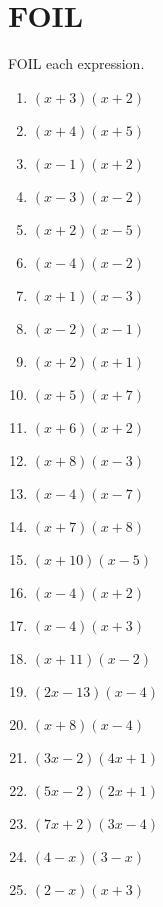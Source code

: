\section{FOIL}
FOIL each expression.
\begin{enumerate}
\item $(x+3)(x+2)$
\item $(x+4)(x+5)$
\item $(x-1)(x+2)$
\item $(x-3)(x-2)$
\item $(x+2)(x-5)$
\item $(x-4)(x-2)$
\item $(x+1)(x-3)$
\item $(x-2)(x-1)$
\item $(x+2)(x+1)$
\item $(x+5)(x+7)$
\item $(x+6)(x+2)$
\item $(x+8)(x-3)$
\item $(x-4)(x-7)$
\item $(x+7)(x+8)$
\item $(x+10)(x-5)$
\item $(x-4)(x+2)$
\item $(x-4)(x+3)$
\item $(x+11)(x-2)$
\item $(2x-13)(x-4)$
\item $(x+8)(x-4)$
\item $(3x-2)(4x+1)$
\item $(5x-2)(2x+1)$
\item $(7x+2)(3x-4)$
\item $(4-x)(3-x)$
\item $(2-x)(x+3)$
\end{enumerate}
